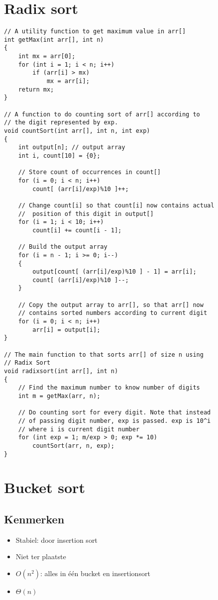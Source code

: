 \documentclass[a4paper]{article}
\begin{document}
\section{Radix sort}
\begin{lstlisting}
// A utility function to get maximum value in arr[]
int getMax(int arr[], int n)
{
    int mx = arr[0];
    for (int i = 1; i < n; i++)
        if (arr[i] > mx)
            mx = arr[i];
    return mx;
}
 
// A function to do counting sort of arr[] according to
// the digit represented by exp.
void countSort(int arr[], int n, int exp)
{
    int output[n]; // output array
    int i, count[10] = {0};
 
    // Store count of occurrences in count[]
    for (i = 0; i < n; i++)
        count[ (arr[i]/exp)%10 ]++;
 
    // Change count[i] so that count[i] now contains actual
    //  position of this digit in output[]
    for (i = 1; i < 10; i++)
        count[i] += count[i - 1];
 
    // Build the output array
    for (i = n - 1; i >= 0; i--)
    {
        output[count[ (arr[i]/exp)%10 ] - 1] = arr[i];
        count[ (arr[i]/exp)%10 ]--;
    }
 
    // Copy the output array to arr[], so that arr[] now
    // contains sorted numbers according to current digit
    for (i = 0; i < n; i++)
        arr[i] = output[i];
}
 
// The main function to that sorts arr[] of size n using 
// Radix Sort
void radixsort(int arr[], int n)
{
    // Find the maximum number to know number of digits
    int m = getMax(arr, n);
 
    // Do counting sort for every digit. Note that instead
    // of passing digit number, exp is passed. exp is 10^i
    // where i is current digit number
    for (int exp = 1; m/exp > 0; exp *= 10)
        countSort(arr, n, exp);
}
\end{lstlisting}
\newpage

\section{Bucket sort}
\subsection*{Kenmerken}
\begin{itemize}
	\item Stabiel: door insertion sort
	\item Niet ter plaatste
	\item $O(n^2)$: alles in \'{e}\'{e}n bucket en insertionsort
	\item $\Theta(n)$
\end{itemize}
\end{document}

